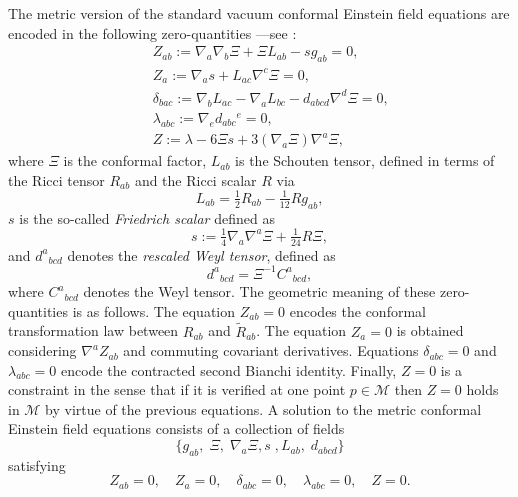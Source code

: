 \documentclass[10pt,a4paper]{article}
\theoremstyle{plain}
\begin{document}
The metric version of the standard vacuum conformal 
Einstein field equations are encoded in the following zero-quantities
  ---see \cite{Fri81a,Fri81b,Fri82,Fri83}:
\begin{subequations}\label{CFE_tensor_zeroquants}
\begin{eqnarray}
&& Z_{ab} := \nabla_{a}\nabla_{b}\Xi  +\Xi L_{ab} - s g_{ab}=0 ,
 \label{StandardCEFEsecondderivativeCF}\\
&& Z_{a} := \nabla_{a}s +L_{ac} \nabla ^{c}\Xi=0 , \label{standardCEFEs}\\
&& \delta_{bac} := \nabla_{b}L_{ac}-\nabla_{a}L_{bc} -
 d_{abcd}\nabla^d{}\Xi =0 , \label{standardCEFESchouten}\\
&& \lambda_{abc}:= \nabla_{e}d_{abc}{}^{e}=0 , \label{standardCEFErescaledWeyl}\\
&& Z := \lambda - 6 \Xi s + 3 (\nabla_{a}\Xi) \nabla^{a}\Xi,
\label{standardCFEconstraintFriedrichScalar}
\end{eqnarray}
\end{subequations}
where $\Xi$ is the conformal factor, $L_{ab}$ is the Schouten tensor,
defined in terms of the Ricci tensor $R_{ab}$ and the Ricci scalar $R$
via
\begin{equation}\label{SchoutenDefinition}
L_{ab}=\tfrac{1}{2}R_{ab}-\tfrac{1}{12}Rg_{ab},
\end{equation}
 $s$ is the so-called \emph{Friedrich scalar} defined as
\begin{equation}\label{s-definition}
s:= \tfrac{1}{4}\nabla_{a}\nabla^{a}\Xi + \tfrac{1}{24}R\Xi,
\end{equation}
and $d^{a}{}_{bcd}$ denotes the \emph{rescaled Weyl tensor}, defined
as
\[d^{a}{}_{bcd}=\Xi^{-1}C^{a}{}_{bcd},\]
where $C^{a}{}_{bcd}$ denotes the Weyl tensor.  The geometric meaning
of these zero-quantities is as follows. The equation $Z_{ab}=0$
encodes the conformal transformation law between ${R}_{ab}$ and
$\tilde{R}_{ab}$.  The equation $Z_{a}=0$ is obtained considering
$\nabla^{a}Z_{ab}$ and commuting covariant derivatives.  Equations
$\delta_{abc}=0$ and $\lambda_{abc}=0$ encode the contracted second
Bianchi identity. Finally, $Z=0$ is a constraint in the sense that if
it is verified at one point $p\in\mathcal{M}$ then $Z=0$ holds in
$\mathcal{M}$ by virtue of the previous equations.  A solution to the
metric conformal Einstein field equations consists of a collection of
fields
\[
\{g_{ab}, \; \Xi, \; \nabla_{a}\Xi,s\;,L_{ab},\; d_{abcd}\}
\]
satisfying
\begin{equation}%
  Z_{ab}=0, \quad Z_{a}=0, \quad \delta_{abc}=0, \quad \lambda_{abc}=0, \quad Z=0.
\end{equation}
\end{document}
